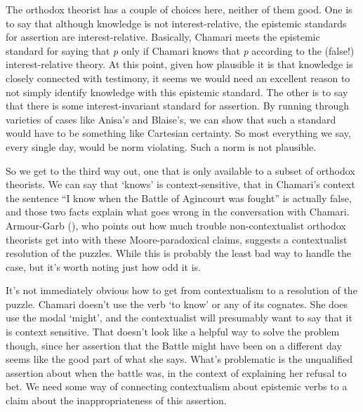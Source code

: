 \documentclass[
  10pt,
  letterpaper,
  twoside]{scrbook}
\begin{document}
The orthodox theorist has a couple of choices here, neither of them
good. One is to say that although knowledge is not interest-relative,
the epistemic standards for assertion are interest-relative. Basically,
Chamari meets the epistemic standard for saying that \emph{p} only if
Chamari knows that \emph{p} according to the (false!) interest-relative
theory. At this point, given how plausible it is that knowledge is
closely connected with testimony, it seems we would need an excellent
reason to not simply identify knowledge with this epistemic standard.
The other is to say that there is some interest-invariant standard for
assertion. By running through varieties of cases like Anisa's and
Blaise's, we can show that such a standard would have to be something
like Cartesian certainty. So most everything we say, every single day,
would be norm violating. Such a norm is not plausible.

So we get to the third way out, one that is only available to a subset
of orthodox theorists. We can say that `knows' is context-sensitive,
that in Chamari's context the sentence ``I know when the Battle of
Agincourt was fought'' is actually false, and those two facts explain
what goes wrong in the conversation with Chamari. Armour-Garb
(), who points out how much trouble
non-contextualist orthodox theorists get into with these
Moore-paradoxical claims, suggests a contextualist resolution of the
puzzles. While this is probably the least bad way to handle the case,
but it's worth noting just how odd it is.

It's not immediately obvious how to get from contextualism to a
resolution of the puzzle. Chamari doesn't use the verb `to know' or any
of its cognates. She does use the modal `might', and the contextualist
will presumably want to say that it is context sensitive. That doesn't
look like a helpful way to solve the problem though, since her assertion
that the Battle might have been on a different day seems like the good
part of what she says. What's problematic is the unqualified assertion
about when the battle was, in the context of explaining her refusal to
bet. We need some way of connecting contextualism about epistemic verbs
to a claim about the inappropriateness of this assertion.
\end{document}
